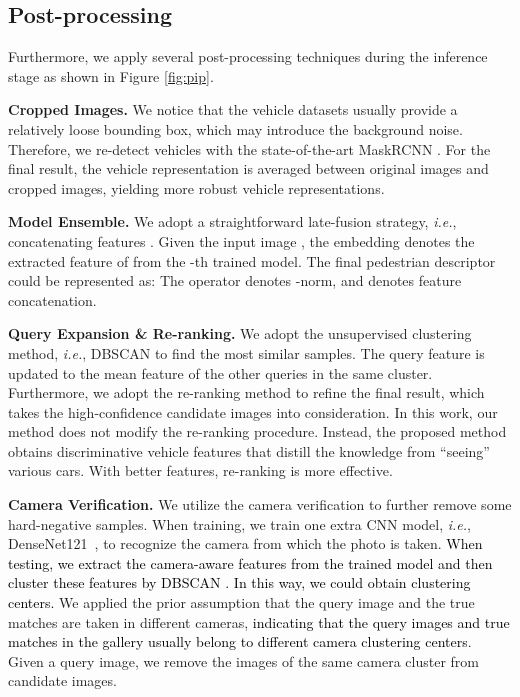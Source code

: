 \documentclass[journal]{IEEEtran}
\def\ie{\emph{i.e.}}
\newcommand{\zznote}[1]{\textcolor{black}{#1}}
\begin{document}
\subsection{Post-processing} \label{sec:post-process}
Furthermore, we apply several post-processing techniques during the inference stage as shown in Figure \ref{fig:pip}. 

\noindent \textbf{Cropped Images.} We notice that the vehicle datasets usually provide a relatively loose bounding box, which may introduce the background noise. Therefore, we re-detect vehicles with the state-of-the-art MaskRCNN \cite{He_2017_ICCV}. For the final result, the vehicle representation is averaged between original images and cropped images, yielding more robust vehicle representations.

\noindent \textbf{Model Ensemble.} We adopt a straightforward late-fusion strategy, \ie, concatenating features \cite{zheng2018pedestrian}. Given the input image , the embedding  denotes the extracted feature of  from the -th trained model. The final pedestrian descriptor could be represented as: The  operator denotes -norm, and  denotes feature concatenation. 

\noindent \textbf{Query Expansion \& Re-ranking.} We adopt the unsupervised clustering method, \ie, DBSCAN \cite{ester1996density} to find the most similar samples. The query feature is updated to the mean feature of the other queries in the same cluster. Furthermore, we adopt the re-ranking method \cite{zhong2017re} to refine the final result, which takes the high-confidence candidate images into consideration. In this work, our method does not modify the re-ranking procedure. Instead, the proposed method obtains discriminative vehicle features that distill the knowledge from ``seeing'' various cars. With better features, re-ranking is more effective.

\noindent \textbf{Camera Verification.} We utilize the camera verification to further remove some hard-negative samples. When training, we train one extra CNN model, \ie, DenseNet121~\cite{huang2017densely}, to recognize the camera from which the photo is taken. \zznote{When testing, we extract the camera-aware features from the trained model and then cluster these features by DBSCAN \cite{ester1996density}. In this way, we could obtain clustering centers.}
We applied the prior assumption that the query image and the true matches are taken in different cameras, \zznote{indicating that the query images and true matches in the gallery usually belong to different camera clustering centers}. Given a query image, we remove the images of the same camera cluster from candidate images. 
\end{document}
